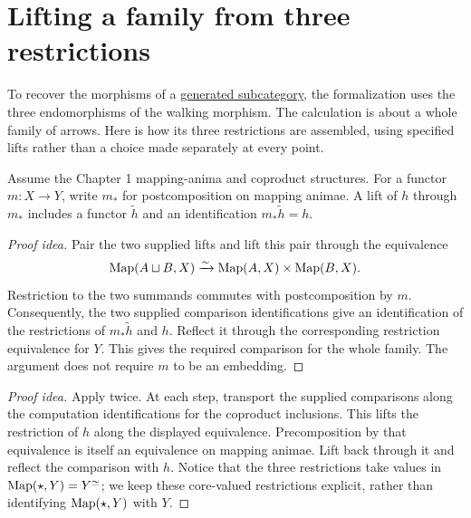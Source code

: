 \documentclass[11pt]{article}
\begin{document}
\section*{Lifting a family from three restrictions}

To recover the morphisms of a \href{subcategories.html}{generated subcategory},
the formalization uses the three endomorphisms of the walking morphism.
The calculation is about a whole family of arrows. Here is how its three
restrictions are assembled, using specified lifts rather than a choice
made separately at every point.

Assume the Chapter 1 mapping-anima and coproduct structures. For a functor
$m\colon X\to Y$, write $m_*$ for postcomposition on mapping animae.
A lift of $h$ through $m_*$ includes a functor $\widetilde h$ and an
identification $m_*\widetilde h=h$.

\begin{proof}[Proof idea]
Pair the two supplied lifts and lift this pair through the equivalence
\[
 \operatorname{Map}(A\sqcup B,X)\xrightarrow{\sim}\operatorname{Map}(A,X)\times\operatorname{Map}(B,X).
\]
Restriction to the two summands commutes with postcomposition by $m$.
Consequently, the two supplied comparison identifications give an
identification of the restrictions of $m_*\widetilde h$ and $h$.
Reflect it through the corresponding restriction equivalence for $Y$.
This gives the required comparison for the whole family. The argument
does not require $m$ to be an embedding.
\end{proof}

\begin{proof}[Proof idea]
Apply  twice. At each step,
transport the supplied comparisons along the computation identifications
for the coproduct inclusions. This lifts the restriction of $h$ along
the displayed equivalence. Precomposition by that equivalence is itself
an equivalence on mapping animae. Lift back through it and reflect the
comparison with $h$. Notice that the three restrictions take values in
$\operatorname{Map}(\star,Y)=Y^\simeq$; we keep these core-valued restrictions explicit, rather than identifying
$\operatorname{Map}(\star,Y)$ with $Y$.
\end{proof}
\end{document}
